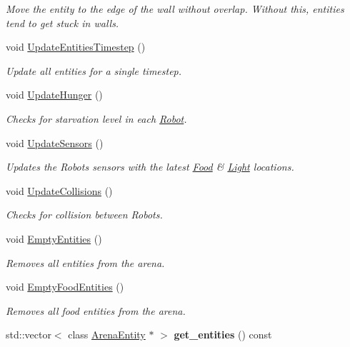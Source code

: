 \begin{DoxyCompactItemize}
\begin{DoxyCompactList}\small\item\em Move the entity to the edge of the wall without overlap. Without this, entities tend to get stuck in walls. \end{DoxyCompactList}\item 
void \hyperlink{classArena_a682ec81cb30e36e5bb801b3388bcb494}{Update\+Entities\+Timestep} ()
\begin{DoxyCompactList}\small\item\em Update all entities for a single timestep. \end{DoxyCompactList}\item 
void \hyperlink{classArena_adf5bf4e98687d011334cad10e0dcdeec}{Update\+Hunger} ()
\begin{DoxyCompactList}\small\item\em Checks for starvation level in each \hyperlink{classRobot}{Robot}. \end{DoxyCompactList}\item 
void \hyperlink{classArena_ac6e2b39f521694aa3252b3f1e4a23f65}{Update\+Sensors} ()
\begin{DoxyCompactList}\small\item\em Updates the Robots\textquotesingle{} sensors with the latest \hyperlink{classFood}{Food} \& \hyperlink{classLight}{Light} locations. \end{DoxyCompactList}\item 
void \hyperlink{classArena_addd5966eeedecd4637da1758fed51230}{Update\+Collisions} ()
\begin{DoxyCompactList}\small\item\em Checks for collision between Robots. \end{DoxyCompactList}\item 
void \hyperlink{classArena_a4f020bfc73de778c82ac79096b2d7751}{Empty\+Entities} ()
\begin{DoxyCompactList}\small\item\em Removes all entities from the arena. \end{DoxyCompactList}\item 
void \hyperlink{classArena_a416511cc5e864407c32d7f15c7d08cd7}{Empty\+Food\+Entities} ()
\begin{DoxyCompactList}\small\item\em Removes all food entities from the arena. \end{DoxyCompactList}\item 
std\+::vector$<$ class \hyperlink{classArenaEntity}{Arena\+Entity} $\ast$ $>$ {\bfseries get\+\_\+entities} () const \hypertarget{classArena_aabb4ffe05aefc71ee10d47b191963fe5}{}\label{classArena_aabb4ffe05aefc71ee10d47b191963fe5}


\end{DoxyCompactItemize}
